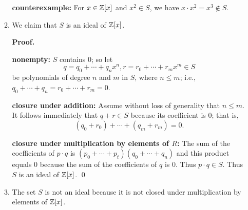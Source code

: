 \begin{enumerate}
\begin{enumerate}
               \textbf{counterexample:} For $x \in \mathbb{Z}[x]$ and $x^2 \in S$, we
               have $x \cdot x^2 = x^3 \notin S$.
         \item We claim that $S$ is an ideal of $\mathbb{Z}[x]$.

               \textbf{Proof.} 

               \textbf{nonempty:} $S$ contains 0; so let
               $$q = q_0 + \cdots + q_nx^n, r = r_0 + \cdots + r_mx^m \in S$$
               be polynomials of degree $n$ and $m$ in $S$, where $n \le m$;
               i.e., $q_0 + \cdots + q_n = r_0 + \cdots + r_m = 0$.

               \textbf{closure under addition:} Assume without loss of
               generality that $n \le m$. It follows immediately that
               $q + r \in S$ because its coefficient is 0; that is,
               $$(q_0 + r_0) + \cdots + (q_m + r_m) = 0.$$

               \textbf{closure under multiplication by elements of $R$:} The
               sum of the coefficients of $p \cdot q$ is
               $(p_0 + \cdots + p_t)(q_0 + \cdots + q_n)$ and this product
               equals 0 because the sum of the coefficients of $q$ is 0. Thus
               $p \cdot q \in S$. Thus $S$ is an ideal of $\mathbb{Z}[x]$. \qed
         \item The set $S$ is not an ideal because it is not closed under
               multiplication by elements of $\mathbb{Z}[x]$.


\end{enumerate}
\end{enumerate}
